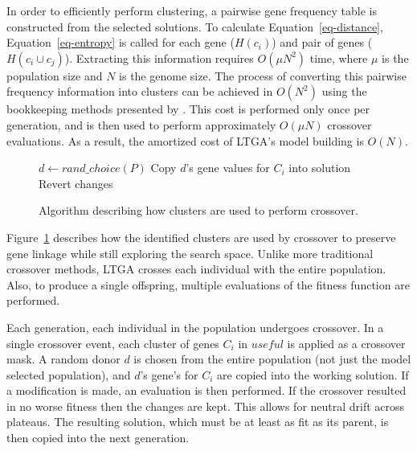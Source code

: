In order to efficiently perform clustering, a pairwise gene frequency table is constructed from the selected solutions.
To calculate Equation~\ref{eq-distance}, Equation~\ref{eq-entropy} is called for each
gene ($H(c_i)$) and pair of genes ($H(c_i \cup c_j)$). Extracting this information requires $O(\mu N^2)$
time, where $\mu$ is the population size and $N$ is the genome size. The process of converting
this pairwise frequency information into clusters can be achieved in $O(N^2)$ using the bookkeeping
methods presented by \cite{gronau:2007:upgma}. This cost is performed only once per generation,
and is then used to perform approximately $O(\mu N)$ crossover evaluations. As a result, the amortized cost of
LTGA's model building is $O(N)$.

\begin{figure}
  \begin{algorithmic}[1]
        \State $d \leftarrow rand\_choice(P)$\label{fig-cluster-usage-donate}
        \State Copy $d$'s gene values for $C_i$ into solution
            \State Revert changes
          \EndIf
        \EndIf
    \EndFor
  \EndProcedure
\end{algorithmic}
  \caption{Algorithm describing how clusters are used to perform crossover.}
  \label{fig-cluster-usage}
\end{figure}

Figure~\ref{fig-cluster-usage} describes how the identified clusters are used by crossover to preserve
gene linkage while still exploring the search space. Unlike more traditional crossover methods, LTGA
crosses each individual with the entire population. Also, to produce a single offspring, multiple evaluations
of the fitness function are performed.

Each generation, each individual in the population undergoes crossover. In a single crossover event, each
cluster of genes $C_i$ in $useful$ is applied as a crossover mask. A random donor $d$
is chosen from the entire population (not just the model selected population), and $d$'s gene's for $C_i$ are copied
into the working solution. If a modification is made, an evaluation is then performed. If the crossover
resulted in no worse fitness then the changes are kept. This allows for neutral drift across plateaus.
The resulting solution, which must be at least as fit as its parent, is then
copied into the next generation.


